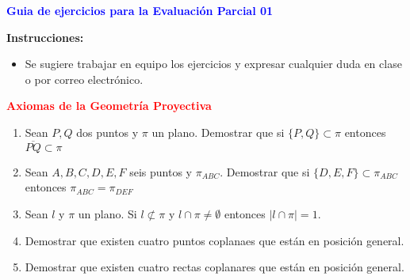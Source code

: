 \documentclass[12pts]{report}
\begin{document}
\begin{center}
\textcolor{blue}{\textbf{\large Guia de ejercicios para la Evaluación Parcial 01 }}\\
\vspace{0.5 cm}
\end{center}

\textbf{\large Instrucciones:}
\begin{itemize}
\item Se sugiere trabajar en equipo los ejercicios y expresar cualquier duda en clase o por correo electrónico.
\end{itemize}

\begin{center}
\textcolor{red}{\textbf{\large Axiomas de la Geometría Proyectiva}}
\end{center}

\begin{enumerate}
 \item Sean $P,Q$ dos puntos y $\pi$ un plano. Demostrar que si $\{P,Q\}\subset \pi$ entonces $\overline{PQ}\subset \pi$
 
 \item Sean $A,B,C,D,E,F$ seis puntos y $\pi_{ABC}$. Demostrar que si $\{D,E,F\}\subset \pi_{ABC}$ entonces $\pi_{ABC}=\pi_{DEF}$
 
\item Sean $l$ y $\pi$ un plano. Si $l\not\subset\pi$ y $l\cap\pi \neq \emptyset$ entonces $|l\cap \pi|= 1$.

\item Demostrar que existen cuatro puntos coplanaes que están en posición general.

\item Demostrar que existen cuatro rectas coplanares que están en posición general.
 
\end{enumerate}
\end{document}
